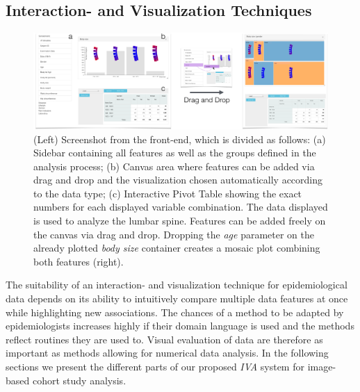 \documentclass[journal]{style/vgtc} 			          %
\begin{document}
\subsection{Interaction- and Visualization Techniques} \label{Interaction- and Visualization Techniques}
\begin{figure}[htb]
 \centering
 \includegraphics[width=1\textwidth, resolution=300]{figures/visualization}
 \caption{(Left) Screenshot from the front-end, which is divided as follows: (a) Sidebar containing all features as well as the groups defined in the analysis process; (b) Canvas area where features can be added via drag and drop and the visualization chosen automatically according to the data type; (c) Interactive Pivot Table showing the exact numbers for each displayed variable combination. The data displayed is used to analyze the lumbar spine. Features can be added freely on the canvas via drag and drop. Dropping the \emph{age} parameter on the already plotted \emph{body size} container creates a mosaic plot combining both features (right).
 }
 \label{fig:visualization}
\end{figure}
%
%
The suitability of an interaction- and visualization technique for epidemiological data depends on its ability to intuitively compare multiple data features at once while highlighting new associations.
%
%
The chances of a method to be adapted by epidemiologists increases highly if their domain language is used and the methods reflect routines they are used to.
%
Visual evaluation of data are therefore as important as methods allowing for numerical data analysis.
%
In the following sections we present the different parts of our proposed \emph{IVA} system for image-based cohort study analysis.
\end{document}
